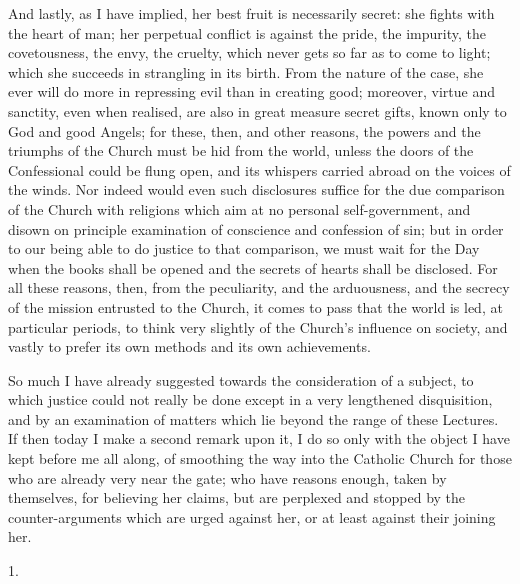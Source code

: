 And lastly, as I have implied, her best fruit is necessarily
secret: she fights with the heart of man; her perpetual conflict is
against the pride, the impurity, the covetousness, the envy, the
cruelty, which never gets so far as to come to light; which she
succeeds in strangling in its birth. From the nature of the case, she
ever will do more in repressing evil than in creating good; moreover,
virtue and sanctity, even when realised, are also in great measure
secret gifts, known only to God and good Angels; for these, then, and
other reasons, the powers and the triumphs of the Church must be hid
from the world, unless the doors of the Confessional could be flung
open, and its whispers carried abroad on the voices of the winds. Nor
indeed would even such disclosures suffice for the due comparison of
the Church with religions which aim at no personal self-government,
and disown on principle examination of conscience and confession of
sin; but in order to our being able to do justice to that comparison,
we must wait for the Day when the books shall be opened and the
secrets of hearts shall be disclosed. For all these reasons, then,
from the peculiarity, and the arduousness, and the secrecy of the
mission entrusted to the Church, it comes to pass that the world is
led, at particular periods, to think very slightly of the Church's
influence on society, and vastly to prefer its own methods and its own
achievements.

So much I have already suggested towards the consideration of a
subject, to which justice could not really be done except in a very
lengthened disquisition, and by an examination of matters which lie
beyond the range of these Lectures. If then today I make a second
remark upon it, I do so only with the object I have kept before me all
along, of smoothing the way into the Catholic Church for those who are
already very near the gate; who have reasons enough, taken by
themselves, for believing her claims, but are perplexed and stopped by
the counter-arguments which are urged against her, or at least against
their joining her.

1.

